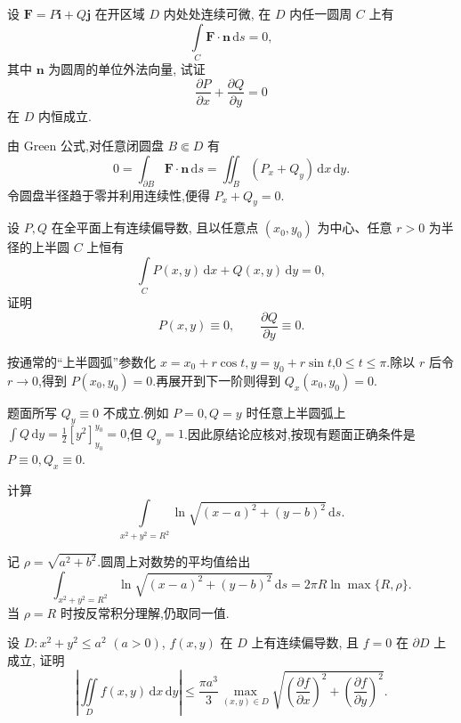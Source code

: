 \begin{example}[\markstar]
    设 $\bm F=P\bm i+Q\bm j$ 在开区域 $D$ 内处处连续可微, 在 $D$ 内任一圆周 $C$ 上有
    \[
        \int\limits_C\bm F\cdot\bm n\,\mathrm{d}s=0,
    \]
    其中 $\bm n$ 为圆周的单位外法向量, 试证
    \[
        \dfrac{\partial P}{\partial x}+\dfrac{\partial Q}{\partial y}=0
    \]
    在 $D$ 内恒成立.
\end{example}
\exampleblank

\begin{solution}
    由 Green 公式,对任意闭圆盘 $B\Subset D$ 有
    \[
        0=\int_{\partial B}\bm F\cdot\bm n\,\mathrm{d}s
        =\iint_B(P_x+Q_y)\,\mathrm{d}x\,\mathrm{d}y.
    \]
    令圆盘半径趋于零并利用连续性,便得 $P_x+Q_y=0$.
\end{solution}

\begin{example}[\markstar]
    设 $P,Q$ 在全平面上有连续偏导数, 且以任意点 $(x_0,y_0)$ 为中心、任意 $r>0$ 为半径的上半圆 $C$ 上恒有
    \[
        \int\limits_C P(x,y)\,\mathrm{d}x+Q(x,y)\,\mathrm{d}y=0,
    \]
    证明
    \[
        P(x,y)\equiv0,
        \qquad
        \dfrac{\partial Q}{\partial y}\equiv0.
    \]
\end{example}
\exampleblank

\begin{solution}
    按通常的“上半圆弧”参数化 $x=x_0+r\cos t,y=y_0+r\sin t$,$0\leq t\leq\pi$.除以 $r$ 后令 $r\to0$,得到 $P(x_0,y_0)=0$.再展开到下一阶则得到 $Q_x(x_0,y_0)=0$.

    题面所写 $Q_y\equiv0$ 不成立.例如 $P=0,Q=y$ 时任意上半圆弧上 $\int Q\,\mathrm{d}y=\frac{1}{2}[y^2]_{y_0}^{y_0}=0$,但 $Q_y=1$.因此原结论应核对,按现有题面正确条件是 $P\equiv0,Q_x\equiv0$.
\end{solution}

\begin{example}
    计算
    \[
        \int\limits_{x^2+y^2=R^2}\ln\sqrt{(x-a)^2+(y-b)^2}\,\mathrm{d}s.
    \]
\end{example}
\exampleblank

\begin{solution}
    记 $\rho=\sqrt{a^2+b^2}$.圆周上对数势的平均值给出
    \[
        \int_{x^2+y^2=R^2}\ln\sqrt{(x-a)^2+(y-b)^2}\,\mathrm{d}s
        =2\pi R\ln\max\{R,\rho\}.
    \]
    当 $\rho=R$ 时按反常积分理解,仍取同一值.
\end{solution}

\begin{example}
    设 $D:x^2+y^2\leq a^2$ $(a>0)$, $f(x,y)$ 在 $D$ 上有连续偏导数, 且 $f=0$ 在 $\partial D$ 上成立, 证明
    \[
        \left|\iint\limits_Df(x,y)\,\mathrm{d}x\,\mathrm{d}y\right|
        \leq\dfrac{\pi a^3}{3}\max_{(x,y)\in D}
        \sqrt{\left(\dfrac{\partial f}{\partial x}\right)^2+
            \left(\dfrac{\partial f}{\partial y}\right)^2}.
    \]
\end{example}
\exampleblank

